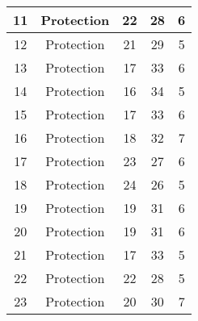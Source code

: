 \documentclass[results.tex]{subfiles}
\begin{document}
\begin{center}
\begin{tabular}{| c || c | c | c | c |}
            \hline
            11                      & Protection                   & 22                     & 28                      & 6                    \\
            \hline
            12                      & Protection                   & 21                     & 29                      & 5                    \\
            \hline
            13                      & Protection                   & 17                     & 33                      & 6                    \\
            \hline
            14                      & Protection                   & 16                     & 34                      & 5                    \\
            \hline
            15                      & Protection                   & 17                     & 33                      & 6                    \\
            \hline
            16                      & Protection                   & 18                     & 32                      & 7                    \\
            \hline
            17                      & Protection                   & 23                     & 27                      & 6                    \\
            \hline
            18                      & Protection                   & 24                     & 26                      & 5                    \\
            \hline
            19                      & Protection                   & 19                     & 31                      & 6                    \\
            \hline
            20                      & Protection                   & 19                     & 31                      & 6                    \\
            \hline
            21                      & Protection                   & 17                     & 33                      & 5                    \\
            \hline
            22                      & Protection                   & 22                     & 28                      & 5                    \\
            \hline
            23                      & Protection                   & 20                     & 30                      & 7                    \\

\end{tabular}
\end{center}
\end{document}
